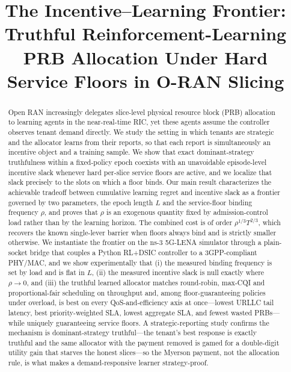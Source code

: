 \documentclass[conference]{IEEEtran}
\theoremstyle{definition}
\theoremstyle{remark}
\newcommand{\Slots}{T}
\newcommand{\Ep}{L}
\newcommand{\rhobind}{\rho}
\begin{document}
\title{The Incentive--Learning Frontier: Truthful Reinforcement-Learning PRB Allocation Under Hard Service Floors in O-RAN Slicing}

\author{
\and
{}
}

\maketitle

\begin{abstract}
Open RAN increasingly delegates slice-level physical resource block (PRB) allocation to learning agents in the near-real-time RIC, yet these agents assume the controller observes tenant demand directly. We study the setting in which tenants are strategic and the allocator learns from their reports, so that each report is simultaneously an incentive object and a training sample. We show that exact dominant-strategy truthfulness within a fixed-policy epoch coexists with an unavoidable episode-level incentive slack whenever hard per-slice service floors are active, and we localize that slack precisely to the slots on which a floor binds. Our main result characterizes the achievable tradeoff between cumulative learning regret and incentive slack as a frontier governed by two parameters, the epoch length $\Ep$ and the service-floor binding frequency $\rhobind$, and proves that $\rhobind$ is an exogenous quantity fixed by admission-control load rather than by the learning horizon. The combined cost is of order $\rhobind^{1/3}\Slots^{2/3}$, which recovers the known single-lever barrier when floors always bind and is strictly smaller otherwise. We instantiate the frontier on the ns-3 5G-LENA simulator through a plain-socket bridge that couples a Python RL+DSIC controller to a 3GPP-compliant PHY/MAC, and we show experimentally that (i) the measured binding frequency is set by load and is flat in $\Ep$, (ii) the measured incentive slack is null exactly where $\rhobind\to0$, and (iii) the truthful learned allocator matches round-robin, max-CQI and proportional-fair scheduling on throughput and, among floor-guaranteeing policies under overload, is best on every QoS-and-efficiency axis at once---lowest URLLC tail latency, best priority-weighted SLA, lowest aggregate SLA, and fewest wasted PRBs---while uniquely guaranteeing service floors. A strategic-reporting study confirms the mechanism is dominant-strategy truthful---the tenant's best response is exactly truthful and the same allocator with the payment removed is gamed for a double-digit utility gain that starves the honest slices---so the Myerson payment, not the allocation rule, is what makes a demand-responsive learner strategy-proof.
\end{abstract}
\end{document}
